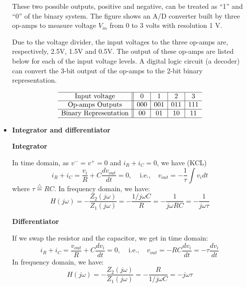 \documentclass{article}
\begin{document}
\begin{itemize}
  These two possible outputs, positive and negative, can be treated as ``1'' 
  and ``0'' of the binary system. The figure shows an A/D converter built by
  three op-amps to measure voltage $V_{in}$ from 0 to 3 volts with resolution 
  1 V.


  Due to the voltage divider, the input voltages to the three op-amps are, 
  respectively, 2.5V, 1.5V and 0.5V. The output of these op-amps are listed
  below for each of the input voltage levels. A digital logic circuit (a
  decoder) can convert the 3-bit output of the op-amps to the 2-bit binary 
  representation.

  \begin{equation}
    \begin{array}{c||c|c|c|c}\hline
      \mbox{Input voltage}        & 0 	& 1	& 2	& 3	\\\hline
      \mbox{Op-amps Outputs}	& 000	& 001	& 011	& 111	\\\hline
      \mbox{Binary Representation}	& 00	& 01	& 10	& 11	\\ \hline
    \end{array}
  \end{equation}


\item {\bf Integrator and differentiator}


  {\bf Integrator}

  In time domain, as $v^-=v^+=0$ and $i_R+i_C=0$, we have (KCL)
  \begin{equation}
    i_R+i_C=\frac{v_i}{R}+C\frac{d v_{out}}{dt}=0,
    \;\;\;\; \mbox{i.e.,}\;\;\;\;v_{out}=-\frac{1}{\tau} \int v_i dt	
  \end{equation}
  where $\tau \stackrel{\triangle}{=}RC$. In frequency domain, we have:
  \begin{equation}
    H(j\omega)=-\frac{Z_2(j\omega)}{Z_1(j\omega)}=-\frac{1/j\omega C}{R}
    =-\frac{1}{j\omega RC}=-\frac{1}{j\omega \tau}	
  \end{equation}

  {\bf Differentiator}

  If we swap the resistor and the capacitor, we get in time domain:
  \begin{equation} 
    i_R+i_C=\frac{v_{out}}{R}+C\frac{d v_i}{dt}=0,\;\;\;\;
    \mbox{i.e.,}\;\;\;\;v_{out}=-RC \frac{d v_i}{dt}=-\tau \frac{d v_i}{dt}	
  \end{equation}
  In frequency domain, we have:
  \begin{equation} 
    H(j\omega)=-\frac{Z_2(j\omega)}{Z_1(j\omega)}=-\frac{R}{1/j\omega C}
    =-j\omega \tau 
  \end{equation}


\end{itemize}
\end{document}
